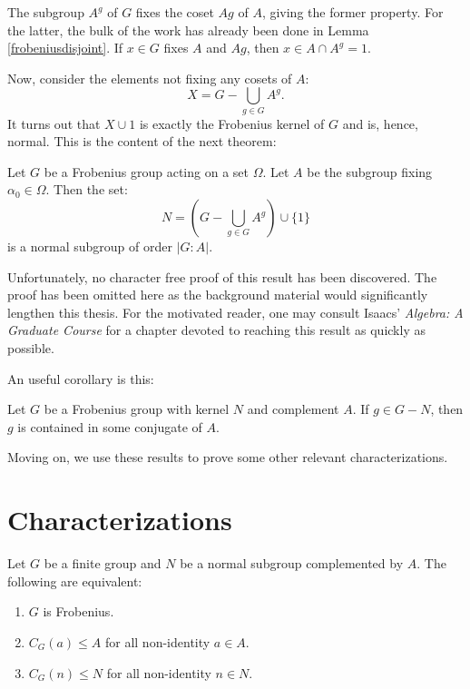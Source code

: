 \documentclass[main.tex]{subfiles}
\begin{document}
The subgroup $A^g$ of $G$ fixes the coset $Ag$ of $A$, giving the former property. For the latter, the bulk of the work has already been done in Lemma \ref{frobeniusdisjoint}. If $x \in G$ fixes $A$ and $Ag$, then $x \in A \cap A^g = 1$.

Now, consider the elements not fixing any cosets of $A$:
$$X = G - \bigcup_{g \in G} A^g\text{.}$$
It turns out that $X \cup {1}$ is exactly the Frobenius kernel of $G$ and is, hence, normal. This is the content of the next theorem:

\begin{theorem}
Let $G$ be a Frobenius group acting on a set $\Omega$. Let $A$ be the subgroup fixing $\alpha_0 \in \Omega$. Then the set:
$$N = (G - \bigcup_{g \in G} A^g) \cup \{1\}$$
is a normal subgroup of order $|G : A|$.
\end{theorem}

Unfortunately, no character free proof of this result has been discovered. The proof has been omitted here as the background material would significantly lengthen this thesis. For the motivated reader, one may consult Isaacs' \emph{Algebra: A Graduate Course} \cite[Ch. 15]{isaacsalgebra} for a chapter devoted to reaching this result as quickly as possible.

An useful corollary is this:

\begin{corollary}\label{frobeniuscorollary}
Let $G$ be a Frobenius group with kernel $N$ and complement $A$. If $g \in G - N$, then $g$ is contained in some conjugate of $A$.
\end{corollary}

Moving on, we use these results to prove some other relevant characterizations.

\hss

\section{Characterizations}

\hss

\begin{lemma}\label{frobeniuscentralizers}
Let $G$ be a finite group and $N$ be a normal subgroup complemented by $A$. The following are equivalent:
\begin{enumerate}
	\item $G$ is Frobenius.
	\item $C_G(a) \le A$ for all non-identity $a \in A$.
	\item $C_G(n) \le N$ for all non-identity $n \in N$.
\end{enumerate}
\end{lemma}
\end{document}
